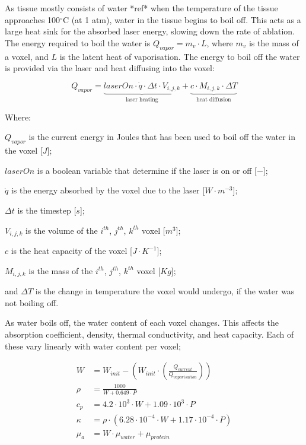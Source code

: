 As tissue mostly consists of water *ref* when the temperature of the tissue approaches 100$^{\circ}$C (at 1 atm), water in the tissue begins to boil off. This acts as a large heat sink for the absorbed laser energy, slowing down the rate of ablation. The energy required to boil the water is $Q_{vapor}=m_v\cdot L$, where $m_v$ is the mass of a voxel, and $L$ is the latent heat of vaporisation. The energy to boil off the water is provided via the laser and heat diffusing into the voxel:

\begin{equation}
Q_{vapor}=\underbrace{laserOn\cdot\dot{q}\cdot \Delta t\cdot V_{i,j,k}}_\text{laser heating} + \underbrace{c\cdot M_{i,j,k}\cdot\Delta T}_\text{heat diffusion}
\end{equation}

\noindent Where:

	\indent $Q_{vapor}$ is the current energy in Joules that has been used to boil off the water in the voxel [$J$];
	
	\indent $laserOn$ is a boolean variable that determine if the laser is on or off [$-$];
	
	\indent $\dot{q}$ is the energy absorbed by the voxel due to the laser [$W\cdot m^{-3}$];
	
	\indent $\Delta t$ is the timestep [$s$];
	
	\indent $V_{i,j,k}$ is the volume of the $i^{th}$, $j^{th}$, $k^{th}$ voxel [$m^3$];
	
	\indent $c$ is the heat capacity of the voxel [$J\cdot K^{-1}$];
	
	\indent $M_{i,j,k}$ is the mass of the $i^{th}$, $j^{th}$, $k^{th}$ voxel [$Kg$];
	
	\indent and $\Delta T$ is the change in temperature the voxel would undergo, if the water was not boiling off.

	\medskip
	
As water boils off, the water content of each voxel changes. This affects the absorption coefficient, density, thermal conductivity, and heat capacity. Each of these vary linearly with water content per voxel\cite{choi2001analysis};

\begin{align}
W &= W_{init} - \left(W_{init} \cdot \left(\tfrac{Q_{current}}{Q_{vaporisation}}\right)\right) \\
\rho &= \frac{1000}{W + 0.649\cdot P} \\
c_p &= 4.2\cdot 10^{3}\cdot W + 1.09\cdot 10^{3}\cdot P \\
\kappa &= \rho \cdot (6.28\cdot 10^{-4}\cdot W + 1.17\cdot 10^{-4} \cdot P)\\
\mu_a &= W \cdot \mu_{water} + \mu_{protein}\\
\end{align}

